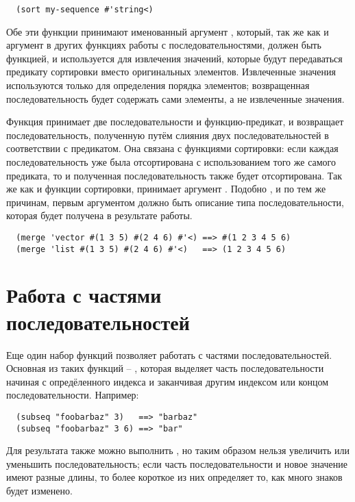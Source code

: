 \begin{verbatim}
  (sort my-sequence #'string<)
\end{verbatim}

Обе эти функции принимают именованный аргумент , который, так же как и аргумент
 в других функциях работы с последовательностями, должен быть функцией, и
используется для извлечения значений, которые будут передаваться предикату сортировки
вместо оригинальных элементов.  Извлеченные значения используются только для определения
порядка элементов; возвращенная последовательность будет содержать сами элементы, а не
извлеченные значения.

Функция  принимает две последовательности и функцию-предикат, и возвращает
последовательность, полученную путём слияния двух последовательностей в соответствии с
предикатом.  Она связана с функциями сортировки: если каждая последовательность
уже была отсортирована с использованием того же самого предиката, то и полученная
последовательность также будет отсортирована.  Так же как и функции сортировки,
 принимает аргумент .  Подобно , и по тем же
причинам, первым аргументом  должно быть описание типа последовательности,
которая будет получена в результате работы.

\begin{verbatim}
  (merge 'vector #(1 3 5) #(2 4 6) #'<) ==> #(1 2 3 4 5 6)
  (merge 'list #(1 3 5) #(2 4 6) #'<)   ==> (1 2 3 4 5 6)
\end{verbatim}

\section{Работа с частями последовательностей}

Еще один набор функций позволяет работать с частями последовательностей.  Основная из
таких функций -- , которая выделяет часть последовательности
начиная с опредёленного индекса и заканчивая другим индексом или концом
последовательности.  Например:

\begin{verbatim}
  (subseq "foobarbaz" 3)   ==> "barbaz"
  (subseq "foobarbaz" 3 6) ==> "bar"
\end{verbatim}

Для результата  также можно выполнить , но таким образом нельзя увеличить
или уменьшить последовательность; если часть последовательности и новое значение имеют
разные длины, то более короткое из них определяет то, как много знаков будет изменено.

